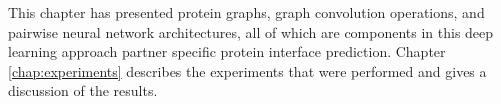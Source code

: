 This chapter has presented protein graphs, graph convolution operations, and pairwise neural network architectures, all of which are components in this deep learning approach partner specific protein interface prediction.
Chapter \ref{chap:experiments} describes the experiments that were performed and gives a discussion of the results.
